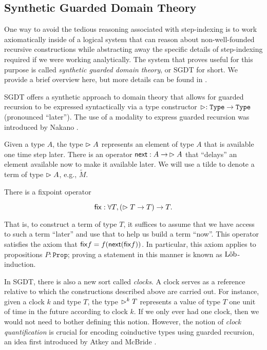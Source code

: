 \documentclass[acmsmall,screen]{acmart}
\begin{document}
\subsection{Synthetic Guarded Domain Theory}
One way to avoid the tedious reasoning associated with step-indexing is to work
axiomatically inside of a logical system that can reason about non-well-founded recursive
constructions while abstracting away the specific details of step-indexing required
if we were working analytically.
The system that proves useful for this purpose is called \emph{synthetic guarded
domain theory}, or SGDT for short. We provide a brief overview here, but more
details can be found in \cite{TODO}.

SGDT offers a synthetic approach to domain theory that allows for guarded recursion
to be expressed syntactically via a type constructor $\vartriangleright : \texttt{Type} \to \texttt{Type}$ 
(pronounced ``later''). The use of a modality to express guarded recursion
was introduced by Nakano \cite{TODO}.

Given a type $A$, the type $\vartriangleright A$ represents an element of type $A$
that is available one time step later. There is an operator $\mathsf{next} : A \to\, \vartriangleright A$
that ``delays'' an element available now to make it available later.
We will use a tilde to denote a term of type $\vartriangleright A$, e.g., $\tilde{M}$.


There is a fixpoint operator

\[
  \mathsf{fix} : \forall T, (\vartriangleright T \to T) \to T.
\]

That is, to construct a term of type $T$, it suffices to assume that we have access to
such a term ``later'' and use that to help us build a term ``now''.
This operator satisfies the axiom that $\mathsf{fix} f = f (\mathsf{next} (\mathsf{fix} f))$.
In particular, this axiom applies to propositions $P : \texttt{Prop}$; proving
a statement in this manner is known as $\text{L\"{o}b}$-induction.

In SGDT, there is also a new sort called \emph{clocks}. A clock serves as a reference
relative to which the constructions described above are carried out.
For instance, given a clock $k$ and type $T$, the type $\vartriangleright^k T$ represents a value of type
$T$ one unit of time in the future according to clock $k$.
If we only ever had one clock, then we would not need to bother defining this notion.
However, the notion of \emph{clock quantification} is crucial for encoding coinductive types using guarded
recursion, an idea first introduced by Atkey and McBride \cite{TODO}.
\end{document}
